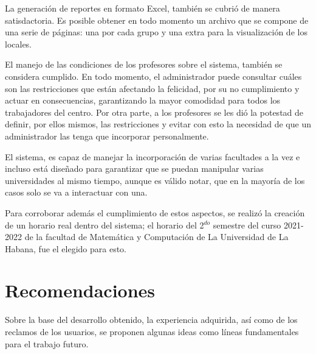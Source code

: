 La generación de reportes en formato Excel, también se cubrió de manera satisdactoria. Es posible obtener en todo momento un archivo que se compone de una serie de páginas: una por cada grupo y una extra para la visualización de los locales. 

El manejo de las condiciones de los profesores sobre el sistema, también se considera cumplido. En todo momento, el administrador puede consultar cuáles son las restricciones que están afectando la felicidad, por su no cumplimiento y actuar en consecuencias, garantizando la mayor comodidad para todos los trabajadores del centro. Por otra parte, a los profesores se les dió la potestad de definir, por ellos mismos, las restricciones y evitar con esto la necesidad de que un administrador las tenga que incorporar personalmente. 

El sistema, es capaz de manejar la incorporación de varias facultades a la vez e incluso está diseñado para garantizar que se puedan manipular varias universidades al mismo tiempo, aunque es válido notar, que en la mayoría de los casos solo se va a interactuar con una. 

Para corroborar además el cumplimiento de estos aspectos, se realizó la creación de un horario real dentro del sistema; el horario del 2$^{do}$ semestre del curso 2021-2022 de la facultad de Matemática y Computación de La Universidad de La Habana, fue el elegido para esto. 

\section{Recomendaciones}

Sobre la base del desarrollo obtenido, la experiencia adquirida, así como de los 
reclamos de los usuarios, se proponen algunas ideas como líneas fundamentales para el trabajo futuro.













